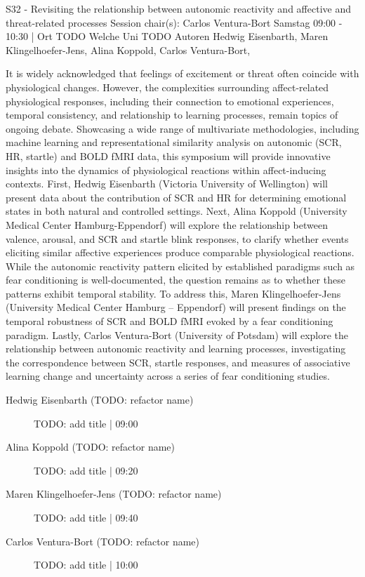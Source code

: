 
            \begin{symposium}
            {S32 - Revisiting the relationship between autonomic reactivity and affective and threat-related processes }
            {Session chair(s): Carlos Ventura-Bort }
            {Samstag 09:00 - 10:30 | Ort TODO}
            {Welche Uni TODO}
            Autoren Hedwig Eisenbarth, Maren Klingelhoefer-Jens, Alina Koppold, Carlos Ventura-Bort, 

It is widely acknowledged that feelings of excitement or threat often coincide with physiological changes. However, the complexities surrounding affect-related physiological responses, including their connection to emotional experiences, temporal consistency, and relationship to learning processes, remain topics of ongoing debate. Showcasing a wide range of multivariate methodologies, including machine learning and representational similarity analysis on autonomic (SCR, HR, startle) and BOLD fMRI data, this symposium will provide innovative insights into the dynamics of physiological reactions within affect-inducing contexts.
First, Hedwig Eisenbarth (Victoria University of Wellington) will present data about the contribution of SCR and HR for determining emotional states in both natural and controlled settings. Next, Alina Koppold (University Medical Center Hamburg-Eppendorf) will explore the relationship between valence, arousal, and SCR and startle blink responses, to clarify whether events eliciting similar affective experiences produce comparable physiological reactions. While the autonomic reactivity pattern elicited by established paradigms such as fear conditioning is well-documented, the question remains as to whether these patterns exhibit temporal stability. To address this, Maren Klingelhoefer-Jens (University Medical Center Hamburg – Eppendorf) will present findings on the temporal robustness of SCR and BOLD fMRI evoked by a fear conditioning paradigm. Lastly, Carlos Ventura-Bort (University of Potsdam) will explore the relationship between autonomic reactivity and learning processes, investigating the correspondence between SCR, startle responses, and measures of associative learning change and uncertainty across a series of fear conditioning studies.
            \begin{description}    
            
                \item [Hedwig Eisenbarth (TODO: refactor name)] TODO: add title \textcolor{mygray}{ | 09:00}    
                
                \item [Alina Koppold (TODO: refactor name)] TODO: add title \textcolor{mygray}{ | 09:20}    
                
                \item [Maren Klingelhoefer-Jens (TODO: refactor name)] TODO: add title \textcolor{mygray}{ | 09:40}    
                
                \item [Carlos Ventura-Bort (TODO: refactor name)] TODO: add title \textcolor{mygray}{ | 10:00}    
                
            \end{description} 
            \end{symposium}
            
